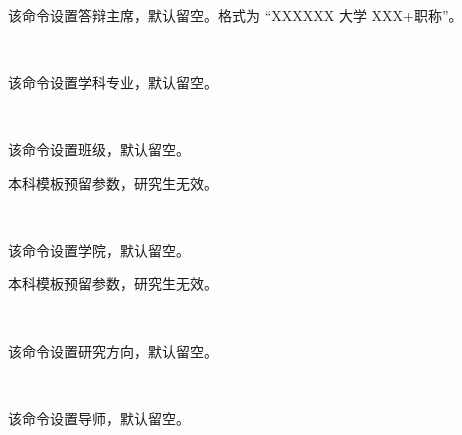 \documentclass{ctxdoc}
\begin{document}
    \begin{function}[added=2024-08-18]{\chairman}
        \begin{syntax}
             \
        \end{syntax}
        该命令设置答辩主席，默认留空。格式为 “XXXXXX 大学 XXX+职称”。
    \end{function}


    \begin{function}[added=2024-08-18]{\major}
        \begin{syntax}
             \\
        \end{syntax}
        该命令设置学科专业，默认留空。
    \end{function}


    \begin{function}[added=2024-08-18]{\class}
        \begin{syntax}
             \\
        \end{syntax}
        该命令设置班级，默认留空。
        \begin{texnote}
            本科模板预留参数，研究生无效。
        \end{texnote}
    \end{function}


    \begin{function}[added=2024-08-18]{\college}
        \begin{syntax}
             \\
        \end{syntax}
        该命令设置学院，默认留空。

        \begin{texnote}
            本科模板预留参数，研究生无效。
        \end{texnote}
    \end{function}


    \begin{function}[added=2024-08-18]{\research}
        \begin{syntax}
             \\
        \end{syntax}
        该命令设置研究方向，默认留空。
    \end{function}


    \begin{function}[added=2024-08-18]{\supervisor}
        \begin{syntax}
             \\
        \end{syntax}
        该命令设置导师，默认留空。
    \end{function}
\end{document}
